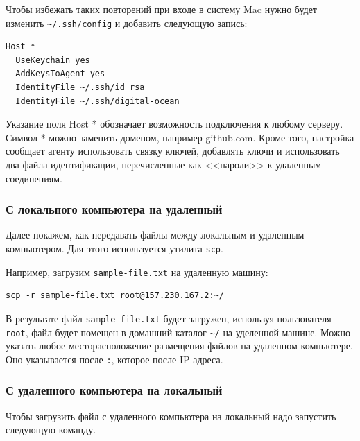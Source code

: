 \documentclass[12pt]{article}
\begin{document}
Чтобы избежать таких повторений при входе в систему Mac нужно будет
изменить \texttt{\textasciitilde{}/.ssh/config} и добавить следующую
запись:

\begin{verbatim}
Host *
  UseKeychain yes
  AddKeysToAgent yes
  IdentityFile ~/.ssh/id_rsa
  IdentityFile ~/.ssh/digital-ocean
\end{verbatim}

Указание поля Host * обозначает возможность подключения к любому
серверу. Символ * можно заменить доменом, например github.com. Кроме
того, настройка сообщает агенту использовать связку ключей, добавлять
ключи и использовать два файла идентификации, перечисленные как <<пароли>>
к удаленным соединениям.

\hypertarget{From-local-computer-to-remote-machine}{%
\subsubsection{\texorpdfstring{\protect\hyperlink{From-local-computer-to-remote-machine}{}С
локального компьютера на
удаленный}{С локального компьютера на удаленный}}\label{From-local-computer-to-remote-machine}}

Далее покажем, как передавать файлы между локальным и удаленным
компьютером. Для этого используется утилита \texttt{scp}.

Например, загрузим \texttt{sample-file.txt} на удаленную машину:

\begin{verbatim}
scp -r sample-file.txt root@157.230.167.2:~/
\end{verbatim}

В результате файл \texttt{sample-file.txt} будет загружен, используя
пользователя \texttt{root}, файл будет помещен в домашний каталог
\texttt{\textasciitilde{}/} на уделенной машине. Можно указать любое
месторасположение размещения файлов на удаленном компьютере. Оно
указывается после \texttt{:}, которое после IP-адреса.

\hypertarget{From-remote-machine-to-local-computer}{%
\subsubsection{\texorpdfstring{\protect\hyperlink{From-remote-machine-to-local-computer}{}С
удаленного компьютера на
локальный}{С удаленного компьютера на локальный}}\label{From-remote-machine-to-local-computer}}

Чтобы загрузить файл с удаленного компьютера на локальный надо запустить
следующую команду.
\end{document}
